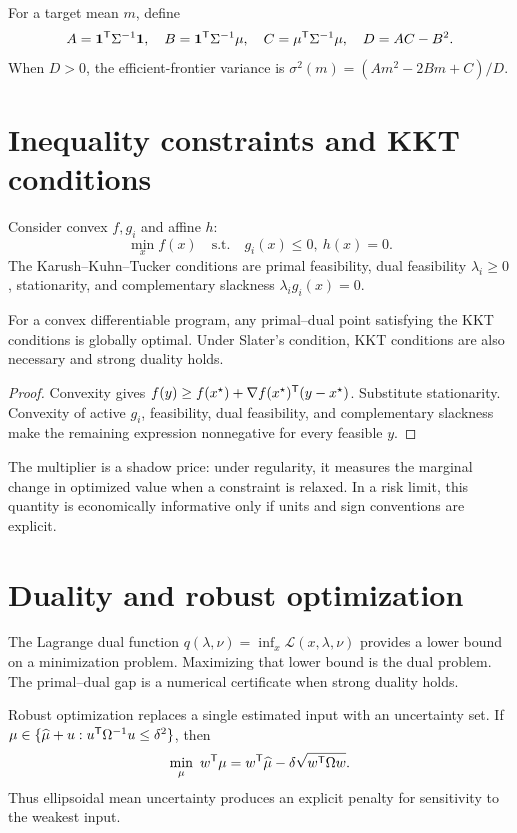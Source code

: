For a target mean $m$, define
\[
A=\bm 1^\mathsf T\Sigma^{-1}\bm 1,\quad
B=\bm 1^\mathsf T\Sigma^{-1}\mu,\quad
C=\mu^\mathsf T\Sigma^{-1}\mu,\quad D=AC-B^2.
\]
When $D>0$, the efficient-frontier variance is
$\sigma^2(m)=(Am^2-2Bm+C)/D$.

\section{Inequality constraints and KKT conditions}

Consider convex $f,g_i$ and affine $h$:
\[
\min_x f(x)\quad\text{s.t.}\quad g_i(x)\leq0,\ h(x)=0.
\]
The Karush--Kuhn--Tucker conditions are primal feasibility, dual feasibility
$\lambda_i\geq0$, stationarity, and complementary slackness
$\lambda_i g_i(x)=0$.

\begin{theorem}
For a convex differentiable program, any primal--dual point satisfying the KKT
conditions is globally optimal. Under Slater's condition, KKT conditions are also
necessary and strong duality holds.
\end{theorem}
\begin{proof}
Convexity gives
$f(y)\geq f(x^\star)+\nabla f(x^\star)^\mathsf T(y-x^\star)$.
Substitute stationarity. Convexity of active $g_i$, feasibility, dual feasibility,
and complementary slackness make the remaining expression nonnegative for every
feasible $y$.
\end{proof}

The multiplier is a shadow price: under regularity, it measures the marginal change
in optimized value when a constraint is relaxed. In a risk limit, this quantity is
economically informative only if units and sign conventions are explicit.

\section{Duality and robust optimization}

The Lagrange dual function $q(\lambda,\nu)=\inf_x\mathcal L(x,\lambda,\nu)$ provides
a lower bound on a minimization problem. Maximizing that lower bound is the dual
problem. The primal--dual gap is a numerical certificate when strong duality holds.

Robust optimization replaces a single estimated input with an uncertainty set.
If $\mu\in\{\widehat\mu+u:u^\mathsf T\Omega^{-1}u\leq\delta^2\}$, then
\[
\min_{\mu}\ w^\mathsf T\mu
=w^\mathsf T\widehat\mu-\delta\sqrt{w^\mathsf T\Omega w}.
\]
Thus ellipsoidal mean uncertainty produces an explicit penalty for sensitivity to
the weakest input.


